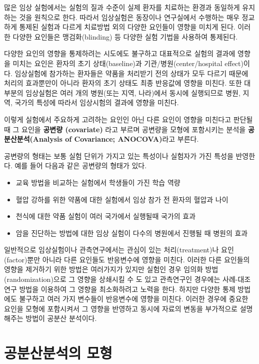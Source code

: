 \documentclass[
]{book}
\providecommand{\tightlist}{%
  \setlength{\itemsep}{0pt}\setlength{\parskip}{0pt}}
\begin{document}
많은 임상 실험에서는 실험의 질과 수준이 실제 환자를 치료하는 환경과 동일하게 유지하는 것을 원칙으로 한다. 따라서 임상실험은 동장이나 연구실에서 수행하는 매우 정교하게 통제된 실험과 다르게 치료방법 외의 다양한 요인들이 영향을 미치게 된다. 이러한 다양한 요인들은 맹검화(blinding) 등 다양한 실험 기법을 사용하여 통제된다.

다양한 요인의 영향을 통제하려는 시도에도 불구하고 대표적으로 실험의 결과에 영향을 미치는 요인은 환자의 초기 상태(baseline)과 기관/병원(center/hospital effect)이다. 임상실험에 참가하는 환자들은 약품을 처리받기 전의 상태가 모두 다르기 때문에 처리의 효과뿐만이 아니라 환자의 초기 상태도 최종 반응값에 영향을 미친다. 또한 대부분의 임상실험은 여러 개의 병원(또는 지역, 나라)에서 동시에 실행되므로 병원, 지역, 국가의 특성에 따라서 임상시험의 결과에 영향을 미친다.

이렇게 실험에서 주요하게 고려하는 요인인 아닌 다른 요인이 영향을 미친다고 판단될 때 그 요인을 \textbf{공변량 (covariate)} 라고 부르며 공변량을 모형에 포함시키는 분석을 \textbf{공분산분석(Analysis of Covariance; ANOCOVA)}라고 부른다.

공변량의 형태는 보통 실험 단위가 가지고 있는 특성이나 실험자가 가진 특성을 반영한다. 예를 들어 다음과 같은 공변량의 형태가 있다.

\begin{itemize}
\tightlist
\item
  교육 방법을 비교하는 실험에서 학생들이 가진 학습 역량
\item
  혈압 강하를 위한 약품에 대한 실험에서 임상 참가 전 환자의 혈압과 나이
\item
  천식에 대한 약품 실험이 여러 국가에서 실행될때 국가의 효과
\item
  암을 진단하는 방법에 대한 임상 실험이 다수의 병원에서 진행될 때 병원의 효과
\end{itemize}

일반적으로 임상실험이나 관측연구에서는 관심이 있는 처리(treatment)나 요인(factor)뿐만 아니라 다른 요인들도 반응변수에 영향을 미친다. 이러한 다른 요인들의 영향을 제거하기 위한 방법은 여러가지가 있지만 실험인 경우 임의화 방법(randomization)으로 그 영향을 상쇄시킬 수 도 있고 관측연구인 경우에는 사례-대조연구 방법을 이용하여 그 영향을 최소화하려고 노력을 한다. 하지만 다양한 통제 방법에도 불구하고 여러 가지 변수들이 반응변수에 영향을 미친다. 이러한 경우에 중요한 요인을 모형에 포함시켜서 그 영향을 반영하고 동시에 자료의 변동을 부가적으로 설명해주는 방법이 공분산 분석이다.

\hypertarget{uxacf5uxbd84uxc0b0uxbd84uxc11duxc758-uxbaa8uxd615}{%
\section{공분산분석의 모형}\label{uxacf5uxbd84uxc0b0uxbd84uxc11duxc758-uxbaa8uxd615}}
\end{document}
